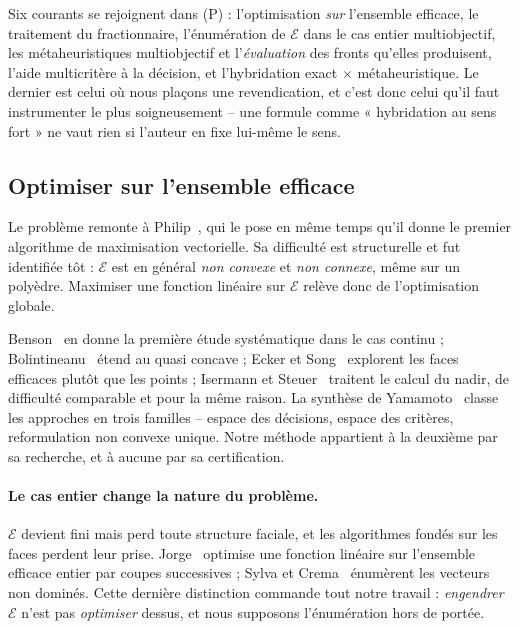 \documentclass[11pt,a4paper]{article}
\theoremstyle{plain}
\theoremstyle{remark}
\newcommand{\Ecal}{\mathcal{E}}
\begin{document}
Six courants se rejoignent dans (P) : l'optimisation \emph{sur}
l'ensemble efficace, le traitement du fractionnaire, l'énumération de
$\Ecal$ dans le cas entier multiobjectif, les métaheuristiques
multiobjectif et l'\emph{évaluation} des fronts qu'elles produisent,
l'aide multicritère à la décision, et l'hybridation exact
$\times$ métaheuristique. Le dernier est celui où nous plaçons une
revendication, et c'est donc celui qu'il faut instrumenter le plus
soigneusement -- une formule comme « hybridation au sens fort » ne vaut
rien si l'auteur en fixe lui-même le sens.

\subsection{Optimiser sur l'ensemble efficace}

Le problème remonte à Philip~\cite{philip1972}, qui le pose en même temps
qu'il donne le premier algorithme de maximisation vectorielle. Sa
difficulté est structurelle et fut identifiée tôt : $\Ecal$ est en général
\emph{non convexe} et \emph{non connexe}, même sur un polyèdre. Maximiser
une fonction linéaire sur $\Ecal$ relève donc de l'optimisation globale.

Benson~\cite{benson1984,benson1986} en donne la première étude
systématique dans le cas continu ; Bolintineanu~\cite{bolintineanu1993}
étend au quasi concave ; Ecker et Song~\cite{eckersong1994} explorent les
faces efficaces plutôt que les points ; Isermann et
Steuer~\cite{isermann1988} traitent le calcul du nadir, de difficulté
comparable et pour la même raison. La synthèse de
Yamamoto~\cite{yamamoto2002} classe les approches en trois familles --
espace des décisions, espace des critères, reformulation non convexe
unique. Notre méthode appartient à la deuxième par sa recherche, et à
aucune par sa certification.

\paragraph{Le cas entier change la nature du problème.} $\Ecal$ devient
fini mais perd toute structure faciale, et les algorithmes fondés sur les
faces perdent leur prise. Jorge~\cite{jorge2009} optimise une fonction
linéaire sur l'ensemble efficace entier par coupes successives ; Sylva et
Crema~\cite{sylva2004} énumèrent les vecteurs non dominés. Cette dernière
distinction commande tout notre travail : \emph{engendrer} $\Ecal$ n'est
pas \emph{optimiser} dessus, et nous supposons l'énumération hors de
portée.
\end{document}

